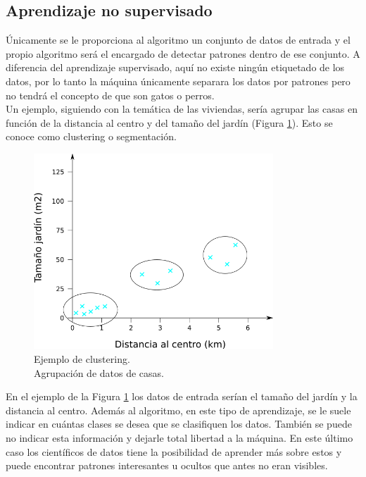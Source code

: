 \subsection{Aprendizaje no supervisado}

Únicamente se le proporciona al algoritmo un conjunto de datos de entrada y el propio algoritmo será el encargado de detectar patrones dentro de ese conjunto. A diferencia del aprendizaje supervisado, aquí no existe ningún etiquetado de los datos, por lo tanto la máquina únicamente separara los datos por patrones pero no tendrá el concepto de que son gatos o perros.\\

Un ejemplo, siguiendo con la temática de las viviendas, sería agrupar las casas en función de la distancia al centro y del tamaño del jardín (Figura \ref{fig:ejemplo_clustering}). Esto se conoce como clustering o segmentación.\\

\begin{figure} [h!]
  \begin{center}
    \includegraphics[width=9cm]{figs/ejemplo_no_supervisado.png}
  \end{center}
  \caption{Ejemplo de clustering.\\
            Agrupación de datos de casas.}
  \label{fig:ejemplo_clustering}
\end{figure}

En el ejemplo de la Figura \ref{fig:ejemplo_clustering} los datos de entrada serían el tamaño del jardín y la distancia al centro. Además al algoritmo, en este tipo de aprendizaje, se le suele indicar en cuántas clases se desea que se clasifiquen los datos. También se puede no indicar esta información y dejarle total libertad a la máquina. En este último caso los científicos de datos tiene la posibilidad de aprender más sobre estos y puede encontrar patrones interesantes u ocultos que antes no eran visibles.

